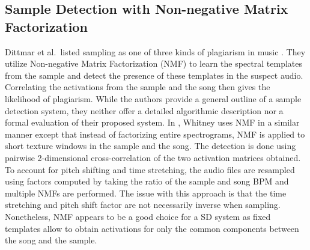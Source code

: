 \documentclass{article}
\begin{document}
\subsection{Sample Detection with Non-negative Matrix Factorization}
%
Dittmar et al.\ listed sampling as one of three kinds of plagiarism in music \cite{dittmar2012audio}. They utilize Non-negative Matrix Factorization (NMF) to learn the spectral templates from the sample and detect the presence of these templates in the suspect audio. Correlating the activations from the sample and the song then gives the likelihood of plagiarism. While the authors provide a general outline of a sample detection system, they neither offer a detailed algorithmic description nor a formal evaluation of their proposed system.
In \cite{whitney2013automatic}, Whitney uses NMF in a similar manner except that instead of factorizing entire spectrograms, NMF is applied to short texture windows in the sample and the song. The detection is done using pairwise 2-dimensional cross-correlation of the two activation matrices obtained. To account for pitch shifting and time stretching, the audio files are resampled using factors computed by taking the ratio of the sample and song BPM and multiple NMFs are performed. %
The issue with this approach is that the time stretching and pitch shift factor are not necessarily inverse when sampling. %
Nonetheless, NMF appears to be a good choice for a SD system as fixed templates allow to obtain activations for only the common components between the song and the sample.
\end{document}
